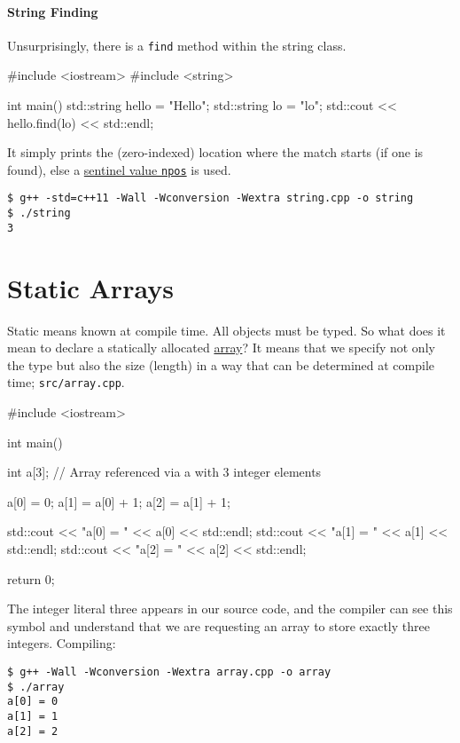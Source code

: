\documentclass[12pt,letterpaper,twoside]{article}
\begin{document}
\paragraph{String Finding} Unsurprisingly, there
is a \texttt{find} method within the string class.
\begin{cpp}
#include <iostream>
#include <string>

int main() {
  std::string hello = "Hello";
  std::string lo = "lo";
  std::cout << hello.find(lo) << std::endl;
}
\end{cpp}

It simply prints the (zero-indexed) location where the match starts
(if one is found), else a
\href{https://en.cppreference.com/w/cpp/string/basic_string/npos}{sentinel
  value \texttt{npos}}  is used.
{\footnotesize
\begin{verbatim}
$ g++ -std=c++11 -Wall -Wconversion -Wextra string.cpp -o string
$ ./string
3
\end{verbatim}
}

\section{Static Arrays}
Static means known at compile time. All objects must be typed. So what
does it mean to declare a statically allocated \href{https://en.cppreference.com/w/cpp/language/array}{array}? It means that we
specify not only the type but also the size (length) in a way that can
be determined at compile time;
\texttt{src/array.cpp}.

\begin{cpp}
#include <iostream>

int main() {
  int a[3]; // Array referenced via a with 3 integer elements

  a[0] = 0;
  a[1] = a[0] + 1;
  a[2] = a[1] + 1;

  std::cout << "a[0] = " << a[0] << std::endl;
  std::cout << "a[1] = " << a[1] << std::endl;
  std::cout << "a[2] = " << a[2] << std::endl;

  return 0;
}
\end{cpp}

The integer literal three appears in our source code, and the compiler
can see this symbol and understand that we are requesting an array
to store exactly three integers.
Compiling:

\begin{verbatim}
$ g++ -Wall -Wconversion -Wextra array.cpp -o array
$ ./array
a[0] = 0
a[1] = 1
a[2] = 2
\end{verbatim}
\end{document}
